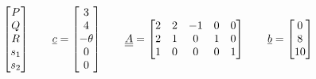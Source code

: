 \documentclass[11pt, oneside]{article}
\begin{document}
\begin{enumerate}
\begin{enumerate}
\begin{align*}
\begin{bmatrix}
              P \\
              Q \\
              R \\
              s_1 \\
              s_2
            \end{bmatrix} \qquad
            \underline{c} =
            \begin{bmatrix}
              3 \\
              4 \\
              -\theta \\
              0 \\
              0
            \end{bmatrix} \qquad
            \underline{\underline{A}} =
            \begin{bmatrix}
              2 & 2 & -1 & 0 & 0 \\
              2 & 1 & 0 & 1 & 0 \\
              1 & 0 & 0 & 0 & 1
            \end{bmatrix} \qquad
            \underline{b} =
            \begin{bmatrix}
              0 \\
              8 \\
              10
            \end{bmatrix}
          \end{align*}


\end{enumerate}
\end{enumerate}
\end{document}
